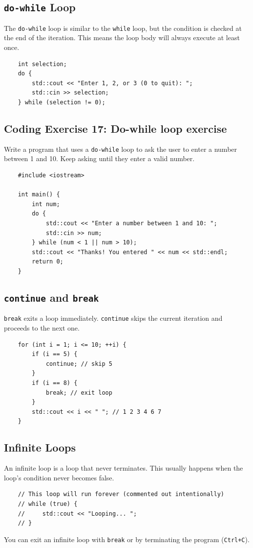 \subsection{\texttt{do-while} Loop}
The \texttt{do-while} loop is similar to the \texttt{while} loop, but the condition is checked at the end of the iteration. This means the loop body will always execute at least once.
\begin{lstlisting}
	int selection;
	do {
		std::cout << "Enter 1, 2, or 3 (0 to quit): ";
		std::cin >> selection;
	} while (selection != 0);
\end{lstlisting}

\subsection{Coding Exercise 17: Do-while loop exercise}
Write a program that uses a \texttt{do-while} loop to ask the user to enter a number between 1 and 10. Keep asking until they enter a valid number.
\begin{lstlisting}
	#include <iostream>

	int main() {
		int num;
		do {
			std::cout << "Enter a number between 1 and 10: ";
			std::cin >> num;
		} while (num < 1 || num > 10);
		std::cout << "Thanks! You entered " << num << std::endl;
		return 0;
	}
\end{lstlisting}

\subsection{\texttt{continue} and \texttt{break}}
\texttt{break} exits a loop immediately. \texttt{continue} skips the current iteration and proceeds to the next one.
\begin{lstlisting}
	for (int i = 1; i <= 10; ++i) {
		if (i == 5) {
			continue; // skip 5
		}
		if (i == 8) {
			break; // exit loop
		}
		std::cout << i << " "; // 1 2 3 4 6 7
	}
\end{lstlisting}

\subsection{Infinite Loops}
An infinite loop is a loop that never terminates. This usually happens when the loop's condition never becomes false.
\begin{lstlisting}
	// This loop will run forever (commented out intentionally)
	// while (true) {
	//     std::cout << "Looping... ";
	// }
\end{lstlisting}
You can exit an infinite loop with \texttt{break} or by terminating the program (\texttt{Ctrl+C}).

